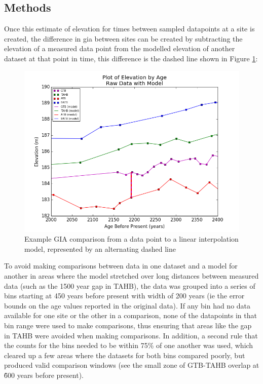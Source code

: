 \documentclass{article}
\begin{document}
 \subsection{Methods}
 Once this estimate of elevation for times between sampled datapoints at a site
 is created, the difference in gia between sites can be created by subtracting
 the elevation of a measured data point from the modelled elevation of another
 dataset at that point in time, this difference is the dashed line shown in
 Figure \ref{fig:rawDataWithModelZoomed}:
 \begin{figure}[h]
	\includegraphics[width=1.1\linewidth]{data/theDataZoomed.png}
	\caption{Example GIA comparison from a data point to a linear interpolation
	model, represented by an alternating dashed line}
	\label{fig:rawDataWithModelZoomed}
 \end{figure}
 To avoid making comparisons between data in one dataset and a model for another
 in areas where the model stretched over long distances between measured data
 (such as the 1500 year gap in TAHB), the data was grouped into a series of bins
 starting at 450 years before present with width of 200 years (ie the error bounds
 on the age values reported in the original data). If any bin had no data
 available for one site or the other in a comparison, none of the datapoints in
 that bin range were used to make comparisons, thus ensuring that areas like the
 gap in TAHB were avoided when making comparisons. In addition, a second rule
 that the counts for the bins needed to be within 75\% of one another was used,
 which cleared up a few areas where the datasets for both bins compared poorly,
 but produced valid comparison windows (see the small zone of GTB-TAHB overlap
 at \~ 600 years before present).
\end{document}
